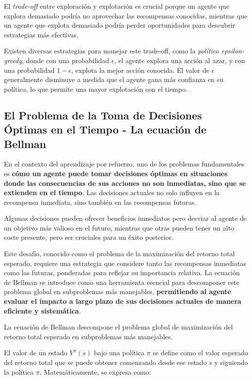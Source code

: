 \documentclass[a4paper,12pt, twoside]{report}
\begin{document}
El \textit{trade-off} entre exploración y explotación es crucial porque un agente que explora 
demasiado podría no aprovechar las recompensas conocidas, mientras que un agente que explota 
demasiado podría perder oportunidades para descubrir estrategias más efectivas. 

Existen diversas estrategias para manejar este trade-off, como la \textit{política epsilon-greedy}, 
donde con una probabilidad \(\epsilon\), el agente explora una acción al azar, y con 
una probabilidad \(1-\epsilon\), explota la mejor acción conocida. El valor de \(\epsilon\) 
generalmente disminuye a medida que el agente gana más confianza en su política, lo que permite 
una mayor explotación con el tiempo.


\subsection{El Problema de la Toma de Decisiones Óptimas en el Tiempo - La ecuación de Bellman}


En el contexto del aprendizaje por refuerzo, uno de los problemas fundamentales es 
\textbf{cómo un agente puede tomar decisiones óptimas en situaciones donde las consecuencias de 
sus acciones no son inmediatas, sino que se extienden en el tiempo}. Las decisiones actuales no 
solo influyen en la recompensa inmediata, sino también en las recompensas futuras. 

Algunas decisiones pueden ofrecer beneficios inmediatos pero desviar al agente de un objetivo 
más valioso en el futuro, mientras que otras pueden tener un alto coste presente, pero ser 
cruciales para un éxito posterior.

Este desafío, conocido como el problema de la maximización del retorno total esperado, 
requiere una estrategia que considere tanto las recompensas inmediatas como las futuras, 
ponderadas para reflejar su importancia relativa. La ecuación de Bellman se introduce como 
una herramienta esencial para descomponer este problema global en subproblemas más manejables, 
\textbf{permitiendo al agente evaluar el impacto a largo plazo de sus decisiones actuales de 
manera eficiente y sistemática}.

La ecuación de Bellman descompone el problema global de maximización del retorno total 
esperado en subproblemas más manejables. 

El valor de un estado \(V^\pi(s)\) bajo una política \(\pi\) se define como el valor esperado 
del retorno total que se puede obtener comenzando desde ese estado \(s\) y siguiendo la política 
\(\pi\). Matemáticamente, se expresa como:
\end{document}
